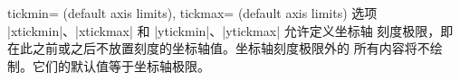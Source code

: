 \begin{pgfplotsxykeylist}{%
    \x tickmin= (default axis limits),
    \x tickmax= (default axis limits)%
}
\label{key:xytickminmax}
    选项 |xtickmin|、|xtickmax| 和 |ytickmin|、|ytickmax| 允许定义坐标轴
    刻度极限，即在此之前或之后不放置刻度的坐标轴值。坐标轴刻度极限外的
    所有内容将不绘制。它们的默认值等于坐标轴极限。
\begin{codeexample}[]
\end{codeexample}
\end{pgfplotsxykeylist}

